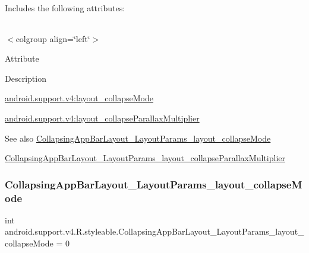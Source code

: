Includes the following attributes\+:

\tabulinesep=1mm
\begin{longtabu} spread 0pt [c]{*{0}{|X[-1]}|}
\hline
\end{longtabu}
$<$colgroup align=\char`\"{}left\char`\"{}$>$ 

Attribute

Description 

{\ttfamily \hyperlink{classandroid_1_1support_1_1v4_1_1R_1_1styleable_a6634b3cf2029d73a6896c60088d6e7db}{android.\+support.\+v4\+:layout\+\_\+collapse\+Mode}}

{\ttfamily \hyperlink{classandroid_1_1support_1_1v4_1_1R_1_1styleable_afdc4be27d8e580fe8002a2351e0ed781}{android.\+support.\+v4\+:layout\+\_\+collapse\+Parallax\+Multiplier}}

\begin{DoxySeeAlso}{See also}
\hyperlink{classandroid_1_1support_1_1v4_1_1R_1_1styleable_a6634b3cf2029d73a6896c60088d6e7db}{Collapsing\+App\+Bar\+Layout\+\_\+\+Layout\+Params\+\_\+layout\+\_\+collapse\+Mode} 

\hyperlink{classandroid_1_1support_1_1v4_1_1R_1_1styleable_afdc4be27d8e580fe8002a2351e0ed781}{Collapsing\+App\+Bar\+Layout\+\_\+\+Layout\+Params\+\_\+layout\+\_\+collapse\+Parallax\+Multiplier} 
\end{DoxySeeAlso}
\mbox{\label{classandroid_1_1support_1_1v4_1_1R_1_1styleable_a6634b3cf2029d73a6896c60088d6e7db}} 
\subsubsection{\texorpdfstring{Collapsing\+App\+Bar\+Layout\+\_\+\+Layout\+Params\+\_\+layout\+\_\+collapse\+Mode}{CollapsingAppBarLayout\_LayoutParams\_layout\_collapseMode}}
{\footnotesize\ttfamily int android.\+support.\+v4.\+R.\+styleable.\+Collapsing\+App\+Bar\+Layout\+\_\+\+Layout\+Params\+\_\+layout\+\_\+collapse\+Mode = 0\hspace{0.3cm}{\ttfamily [static]}}

